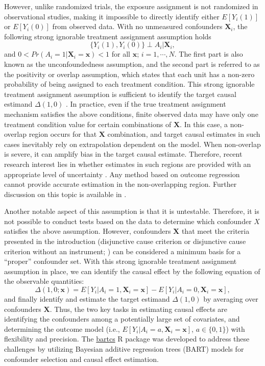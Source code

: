 However, unlike randomized trials, the exposure assignment is not randomized in observational studies, making it impossible to directly identify either $E[Y_i(1)]$ or $E[Y_i(0)]$ from observed data. With no unmeasured confounders $\boldsymbol{X}_i$, the following strong ignorable treatment assignment assumption \citep{rosenbaum_central_1983} holds
\[\{Y_i(1), Y_i(0)\} \perp A_i | \boldsymbol{X}_i, \]
and $0 < Pr(A_i=1 | \boldsymbol{X}_i=\boldsymbol{x}) < 1$ for all $\boldsymbol{x}$; $i=1, \cdots, N$.
The first part is also known as the unconfoundedness assumption, and the second part is referred to as the positivity or overlap assumption, which states that each unit has a non-zero probability of being assigned to each treatment condition. This strong ignorable treatment assignment assumption is sufficient to identify the target causal estimand $\Delta(1,0)$ \citep{rosenbaum_central_1983, ding2018causal, li2023bayesian}. In practice, even if the true treatment assignment mechanism satisfies the above conditions, finite observed data may have only one treatment condition value for certain combinations of $\boldsymbol{X}$. In this case, a non-overlap region occurs for that $\boldsymbol{X}$ combination, and target causal estimates in such cases inevitably rely on extrapolation dependent on the model. When non-overlap is severe, it can amplify bias in the target causal estimate. Therefore, recent research interest lies in whether estimates in such regions are provided with an appropriate level of uncertainty \citep{papadogeorgou2020invited,oganisian2020invited,li2023bayesian}. Any method based on outcome regression cannot provide accurate estimation in the non-overlapping region. Further discussion on this topic is available in \cite{li2023bayesian}.

Another notable aspect of this assumption is that it is untestable. Therefore, it is not possible to conduct tests based on the data to determine which confounder $X$ satisfies the above assumption. However, confounders $\boldsymbol{X}$ that meet the criteria presented in the introduction (disjunctive cause criterion or disjunctive cause criterion without an instrument; \citep{vanderweele2019principles}) can be considered a minimum basis for a ``proper'' confounder set. With this strong ignorable treatment assignment assumption in place, we can identify the causal effect by the following equation of the observable quantities:
\[\Delta(1, 0; \boldsymbol{x}) = E[Y_i|A_i=1, \boldsymbol{X}_i=\boldsymbol{x}]-E[Y_i|A_i=0, \boldsymbol{X}_i=\boldsymbol{x}],\]
and finally identify and estimate the target estimand $\Delta(1, 0)$ by averaging over confounders $\boldsymbol{X}$. Thus, the two key tasks in estimating causal effects are identifying the confounders among a potentially large set of covariates, and determining the outcome model (i.e., $E[Y_i|A_i=a, \boldsymbol{X}_i=\boldsymbol{x}]$, $a \in \{0, 1\}$) with flexibility and precision. The \href{https://CRAN.R-project.org/package=bartcs}{bartcs} R package was developed to address these challenges by utilizing Bayesian additive regression trees (BART) models for confounder selection and causal effect estimation. 


